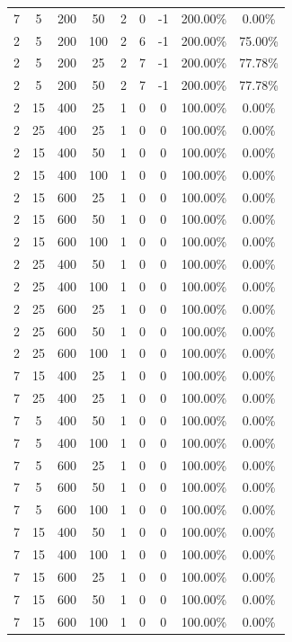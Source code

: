 {\begin{longtable}{| c | c | c | c | c | c | c | c | c |}
7 & 5 & 200 & 50 & 2 & 0 & -1 & 200.00\% & 0.00\% \\
2 & 5 & 200 & 100 & 2 & 6 & -1 & 200.00\% & 75.00\% \\
2 & 5 & 200 & 25 & 2 & 7 & -1 & 200.00\% & 77.78\% \\
2 & 5 & 200 & 50 & 2 & 7 & -1 & 200.00\% & 77.78\% \\
2 & 15 & 400 & 25 & 1 & 0 & 0 & 100.00\% & 0.00\% \\
2 & 25 & 400 & 25 & 1 & 0 & 0 & 100.00\% & 0.00\% \\
2 & 15 & 400 & 50 & 1 & 0 & 0 & 100.00\% & 0.00\% \\
2 & 15 & 400 & 100 & 1 & 0 & 0 & 100.00\% & 0.00\% \\
2 & 15 & 600 & 25 & 1 & 0 & 0 & 100.00\% & 0.00\% \\
2 & 15 & 600 & 50 & 1 & 0 & 0 & 100.00\% & 0.00\% \\
2 & 15 & 600 & 100 & 1 & 0 & 0 & 100.00\% & 0.00\% \\
2 & 25 & 400 & 50 & 1 & 0 & 0 & 100.00\% & 0.00\% \\
2 & 25 & 400 & 100 & 1 & 0 & 0 & 100.00\% & 0.00\% \\
2 & 25 & 600 & 25 & 1 & 0 & 0 & 100.00\% & 0.00\% \\
2 & 25 & 600 & 50 & 1 & 0 & 0 & 100.00\% & 0.00\% \\
2 & 25 & 600 & 100 & 1 & 0 & 0 & 100.00\% & 0.00\% \\
7 & 15 & 400 & 25 & 1 & 0 & 0 & 100.00\% & 0.00\% \\
7 & 25 & 400 & 25 & 1 & 0 & 0 & 100.00\% & 0.00\% \\
7 & 5 & 400 & 50 & 1 & 0 & 0 & 100.00\% & 0.00\% \\
7 & 5 & 400 & 100 & 1 & 0 & 0 & 100.00\% & 0.00\% \\
7 & 5 & 600 & 25 & 1 & 0 & 0 & 100.00\% & 0.00\% \\
7 & 5 & 600 & 50 & 1 & 0 & 0 & 100.00\% & 0.00\% \\
7 & 5 & 600 & 100 & 1 & 0 & 0 & 100.00\% & 0.00\% \\
7 & 15 & 400 & 50 & 1 & 0 & 0 & 100.00\% & 0.00\% \\
7 & 15 & 400 & 100 & 1 & 0 & 0 & 100.00\% & 0.00\% \\
7 & 15 & 600 & 25 & 1 & 0 & 0 & 100.00\% & 0.00\% \\
7 & 15 & 600 & 50 & 1 & 0 & 0 & 100.00\% & 0.00\% \\
7 & 15 & 600 & 100 & 1 & 0 & 0 & 100.00\% & 0.00\% \\

\end{longtable}}
